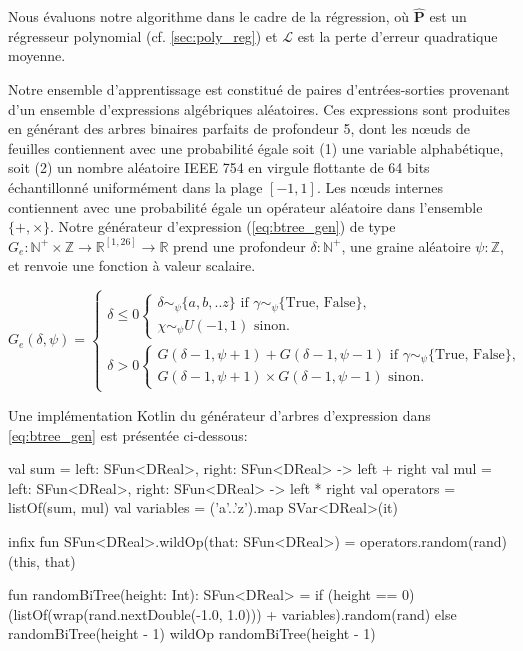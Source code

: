 Nous évaluons notre algorithme dans le cadre de la régression, où $\mathbf{\hat P}$ est un régresseur polynomial (cf. \autoref{sec:poly_reg}) et $\mathcal{L}$ est la perte d'erreur quadratique moyenne.

Notre ensemble d'apprentissage est constitué de paires d'entrées-sorties provenant d'un ensemble d'expressions algébriques aléatoires. Ces expressions sont produites en générant des arbres binaires parfaits de profondeur 5, dont les nœuds de feuilles contiennent avec une probabilité égale soit (1) une variable alphabétique, soit (2) un nombre aléatoire IEEE 754 en virgule flottante de 64 bits échantillonné uniformément dans la plage $[-1, 1]$. Les nœuds internes contiennent avec une probabilité égale un opérateur aléatoire dans l'ensemble $\{+, \times\}$. Notre générateur d'expression (\autoref{eq:btree_gen}) de type $G_e: \mathbb{N}^+\times\mathbb{Z} \rightarrow \mathbb{R}^{[1, 26]} \rightarrow \mathbb{R}$ prend une profondeur $\delta: \mathbb{N}^+$, une graine aléatoire $\psi: \mathbb{Z}$, et renvoie une fonction à valeur scalaire.

\begin{equation}\label{eq:btree_gen}
G_e(\delta, \psi) = \begin{cases}
    \delta \leq 0 \begin{cases}
    \delta\sim_\psi\{a,b,..z\} \text{ if } \gamma\sim_\psi\{\text{True, False}\},\\
    \chi\sim_\psi U(-1, 1) \text{ sinon.}
    \end{cases} \\
    \delta > 0 \begin{cases}
    G(\delta-1, \psi + 1) + G(\delta-1, \psi - 1) \text{ if } \gamma\sim_\psi\{\text{True, False}\},\\
    G(\delta-1, \psi + 1) \times G(\delta-1, \psi - 1) \text{ sinon.}
    \end{cases}
\end{cases}
\end{equation}

Une implémentation Kotlin du générateur d'arbres d'expression dans \autoref{eq:btree_gen} est présentée ci-dessous:
%
\begin{kotlinlisting}
val sum = { left: SFun<DReal>, right: SFun<DReal> -> left + right }
val mul = { left: SFun<DReal>, right: SFun<DReal> -> left * right }
val operators = listOf(sum, mul)
val variables = ('a'..'z').map { SVar<DReal>(it) }

infix fun SFun<DReal>.wildOp(that: SFun<DReal>) = operators.random(rand)(this, that)

fun randomBiTree(height: Int): SFun<DReal> =
  if (height == 0) (listOf(wrap(rand.nextDouble(-1.0, 1.0))) + variables).random(rand)
  else randomBiTree(height - 1) wildOp randomBiTree(height - 1)
\end{kotlinlisting}

